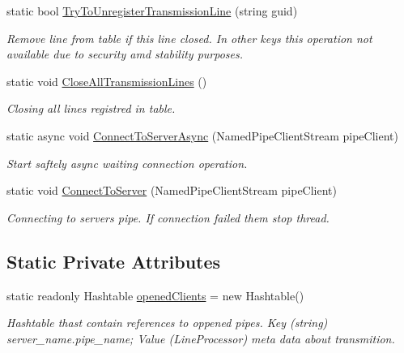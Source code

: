 \begin{DoxyCompactItemize}
static bool \mbox{\hyperlink{class_pipes_provider_1_1_client_1_1_client_a_p_i_a20139222de5ce13aa336e7c4db174f91}{Try\+To\+Unregister\+Transmission\+Line}} (string guid)
\begin{DoxyCompactList}\small\item\em Remove line from table if this line closed. In other keys this operation not available due to security amd stability purposes. \end{DoxyCompactList}\item 
static void \mbox{\hyperlink{class_pipes_provider_1_1_client_1_1_client_a_p_i_a4c588f18a7e7ff618702a27681543889}{Close\+All\+Transmission\+Lines}} ()
\begin{DoxyCompactList}\small\item\em Closing all lines registred in table. \end{DoxyCompactList}\item 
static async void \mbox{\hyperlink{class_pipes_provider_1_1_client_1_1_client_a_p_i_aaececd585be8b8660bb419e3bdb4aaec}{Connect\+To\+Server\+Async}} (Named\+Pipe\+Client\+Stream pipe\+Client)
\begin{DoxyCompactList}\small\item\em Start saftely async waiting connection operation. \end{DoxyCompactList}\item 
static void \mbox{\hyperlink{class_pipes_provider_1_1_client_1_1_client_a_p_i_a39908f350bea38807f4772ed4742abbb}{Connect\+To\+Server}} (Named\+Pipe\+Client\+Stream pipe\+Client)
\begin{DoxyCompactList}\small\item\em Connecting to server\textquotesingle{}s pipe. If connection failed them stop thread. \end{DoxyCompactList}\end{DoxyCompactItemize}
\subsection*{Static Private Attributes}
\begin{DoxyCompactItemize}
\item 
static readonly Hashtable \mbox{\hyperlink{class_pipes_provider_1_1_client_1_1_client_a_p_i_aafef8e556d18d889412c1f48451250c4}{opened\+Clients}} = new Hashtable()
\begin{DoxyCompactList}\small\item\em Hashtable thast contain references to oppened pipes. Key (string) server\+\_\+name.\+pipe\+\_\+name; Value (Line\+Processor) meta data about transmition. \end{DoxyCompactList}\end{DoxyCompactItemize}


